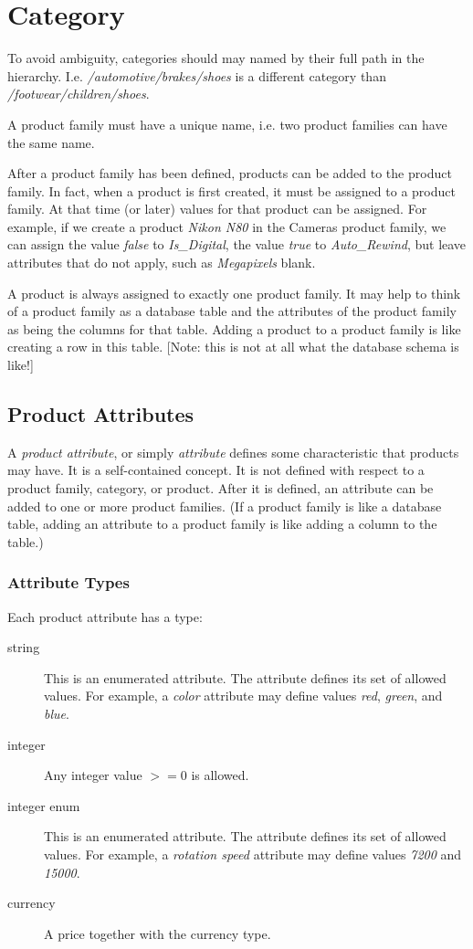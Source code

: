\documentclass[letterpaper, 12pt]{article}
\begin{document}
\section{Category}
 To avoid ambiguity, categories should may named by their full path in the hierarchy. I.e. \textit{/automotive/brakes/shoes} is a different category than \textit{/footwear/children/shoes}.

A product family must have a unique name, i.e. two product families can have the same name.

After a product family has been defined, products can be added to the product family.  In fact, when a product is first created, it must be assigned to a product family.  At that time (or later) values for that product can be assigned.  For example, if we create a product {\em Nikon N80} in the Cameras product family, we can assign the value \textit{false} to \textit{Is\_Digital}, the value \textit{true} to \textit{Auto\_Rewind},
but leave attributes that do not apply, such as \textit{Megapixels} blank.

A product is always assigned to exactly one product family.  It may help to think of a product family as a database table and the attributes of the product family as being the columns for that table.  Adding a product to a product family is like creating a row in this table.  [Note: this is not at all what the database schema is like!]

\subsection{Product Attributes}
A \textit{product attribute}, or simply \textit{attribute} defines some characteristic that products may have.   It is a self-contained concept.  It is not defined with respect to a product family, category, or product.  After it is defined, an attribute can be added to one or more product families.  (If a product family is like a database table, adding an attribute to a product family is like adding a column to the table.)

\subsubsection{Attribute Types}
Each product attribute has a type:
\begin{description}
\item[string] This is an enumerated  attribute.  The attribute defines its set of allowed values.  For example, a \textit{color} attribute may define values \textit{red}, \textit{green}, and \textit{blue}.
\item[integer] Any integer value $>= 0$ is allowed.
\item[integer enum] This is an enumerated attribute.  The attribute defines its set of allowed values.  For example, a \textit{rotation speed} attribute may define values \textit{7200} and \textit{15000}.
\item[currency] A price together with the currency type.
\end{description}
\end{document}
